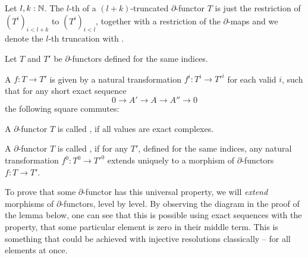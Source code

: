 \begin{definition}
  Let $l,k:\mathbb{N}$.
  The $l$-th  of a $(l+k)$-truncated $\partial$-functor $T$
  is just the restriction of $(T^i)_{i<l+k}$ to $(T^i)_{i<l}$, together with a restriction of the $\partial$-maps
  and we denote the $l$-th truncation with .
\end{definition}

\begin{definition}
  Let $T$ and $T'$ be $\partial$-functors defined for the same indices.
  
  A  $f:T\to T'$ is given by a natural transformation $f^i:T^i\to T'^i$ for each valid $i$,
  such that for any short exact sequence
  \[ 0\to A'\to A\to A''\to 0\]
  the following square commutes:
  \begin{center}
  \end{center}
\end{definition}

\begin{definition}
  A $\partial$-functor $T$ is called ,
  if all values are exact complexes.
\end{definition}

\begin{definition}
  A $\partial$-functor $T$ is called , if for any $T'$, defined for the same indices,
  any natural transformation $f^0:T^0\to T'^0$ extends uniquely to a morphism of $\partial$-functors $f:T\to T'$.
\end{definition}

To prove that some $\partial$-functor has this universal property,
we will \emph{extend} morphisms of $\partial$-functors, level by level.
By observing the diagram in the proof of the lemma below,
one can see that this is possible using exact sequences with the property,
that some particular element is zero in their middle term.
This is something that could be achieved with injective resolutions classically -- for all elements at once.

